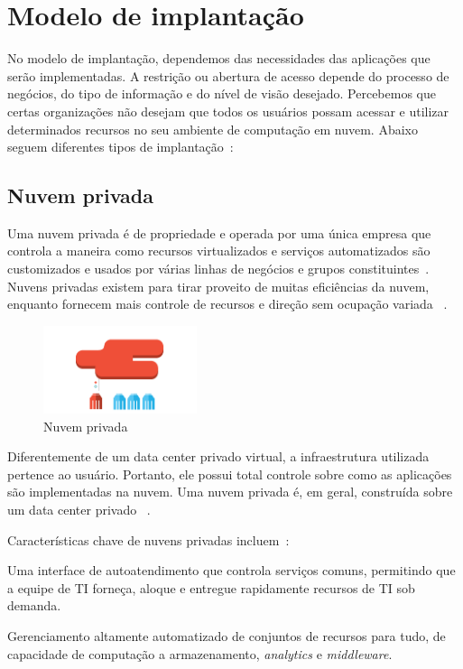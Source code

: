 \section{Modelo de implantação}

No modelo de implantação, dependemos das necessidades das aplicações que serão
implementadas. A restrição ou abertura de acesso depende do processo de negócios,
do tipo de informação e do nível de visão desejado. Percebemos que certas
organizações não desejam que todos os usuários possam acessar e utilizar
determinados recursos no seu ambiente de computação em nuvem. Abaixo seguem
diferentes tipos de implantação~\cite{ibm-what-is-cloud-computing}:

\subsection{Nuvem privada}

Uma nuvem privada é de propriedade e operada por uma única empresa que controla a 
maneira como recursos virtualizados e serviços automatizados são customizados e 
usados por várias linhas de negócios e grupos 
constituintes~\cite{ibm-what-is-cloud-computing}. Nuvens privadas existem para tirar 
proveito de muitas eficiências da nuvem, enquanto fornecem mais controle de recursos 
e direção sem ocupação variada ~\cite{ibm-what-is-cloud-computing}.

\begin{figure}[ht]
    \centering
    \includegraphics[width=0.4\textwidth]{img/private.png}
    \caption{Nuvem privada~\cite{ibm-what-is-cloud-computing}}
    \label{img:privatecloud}
\end{figure}

Diferentemente de um data center privado virtual, a infraestrutura utilizada
pertence ao usuário. Portanto, ele possui total controle sobre como as aplicações
são implementadas na nuvem. Uma nuvem privada é, em geral, construída sobre um data
center privado ~\cite{technet-cloud-computing}.

Características chave de nuvens privadas incluem~\cite{ibm-what-is-cloud-computing}:

\begin{itemise}
    \item Uma interface de autoatendimento que controla serviços comuns, permitindo
        que a equipe de TI forneça, aloque e entregue rapidamente recursos de TI
        sob demanda. 
    \item Gerenciamento altamente automatizado de conjuntos de recursos para tudo,
        de capacidade de computação a armazenamento, \emph{analytics} e
        \emph{middleware}.
\end{itemise}

